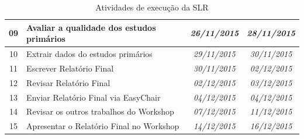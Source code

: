 \documentclass{article}
\begin{document}
\begin{table}[htb]
{\begin{tabular}{|c|l|c|c|}
09          & Avaliar a qualidade dos estudos primários                                                                                                 & \textit{26/11/2015}                              & \textit{28/11/2015}                               \\ \hline
10          & Extrair dados do estudos primários                                                                                                        & \textit{29/11/2015}                              & \textit{30/11/2015}                               \\ \hline
11          & Escrever Relatório Final                                                                                                                  & \textit{30/11/2015}                              & \textit{02/12/2015}                               \\ \hline
12          & Revisar Relatório Final                                                                                                                   & \textit{02/12/2015}                              & \textit{03/12/2015}                               \\ \hline
13          & Enviar Relatório Final via EasyChair                                                                                                      & \textit{04/12/2015}                              & \textit{04/12/2015}                               \\ \hline
14          & Revisar os outros trabalhos do Workshop                                                                                                   & \textit{07/12/2015}                              & \textit{11/12/2015}                               \\ \hline
15          & Apresentar o Relatório Final no Workshop                                                                                                  & \textit{14/12/2015}                              & \textit{16/12/2015}                               \\ \hline
\end{tabular}
}
\caption{Atividades de execução da SLR}
\label{tab:cronograma}
\end{table}

\pagebreak

\medskip

\end{document}
